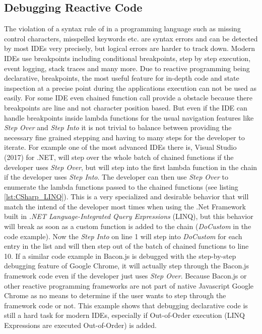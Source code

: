 \subsection{Debugging Reactive Code}
The violation of a syntax rule of in a programming language such as missing control characters, misspelled keywords etc. are syntax errors and can be detected by most IDEs very precisely, but logical errors are harder to track down. Modern IDEs use breakpoints including conditional breakpoints, step by step execution, event logging, stack traces and many more. Due to reactive programming being declarative, breakpoints, the most useful feature for in-depth code and state inspection at a precise point during the applications execution can not be used as easily. For some IDE even chained function call provide a obstacle because there breakpoints are line and not character position based. But even if the IDE can handle breakpoints inside lambda functions for the usual navigation features like \emph{Step Over} and \emph{Step Into} it is not trivial to balance between providing the necessary fine grained stepping and having to many steps for the developer to iterate. For example one of the most advanced IDEs there is, Visual Studio (2017) for .NET, will step over the whole batch of chained functions if the developer uses \emph{Step Over}, but will step into the first lambda function in the chain if the developer uses \emph{Step Into}. The developer can then use \emph{Step Over} to enumerate the lambda functions passed to the chained functions (see listing \ref{lst:CSharp_LINQ}). This is a very specialized and desirable behavior that will match the intend of the developer most times when using the .Net Framework built in \emph{.NET Language-Integrated Query Expressions} (LINQ), but this behavior will break as soon as a custom function is added to the chain (\emph{DoCustom} in the code example). Now the \emph{Step Into} on line 1 will step into \emph{DoCustom} for each entry in the list and will then step out of the batch of chained functions to line 10. If a similar code example in Bacon.js is debugged with the step-by-step debugging feature of Google Chrome, it will actually step through the Bacon.js framework code even if the developer just uses \emph{Step Over}. Because Bacon.js or other reactive programming frameworks are not part of native Javascript Google Chrome as no means to determine if the user wants to step through the framework code or not.
This example shows that debugging declarative code is still a hard task for modern IDEs, especially if Out-of-Order execution (LINQ Expressions are executed Out-of-Order) is added.
